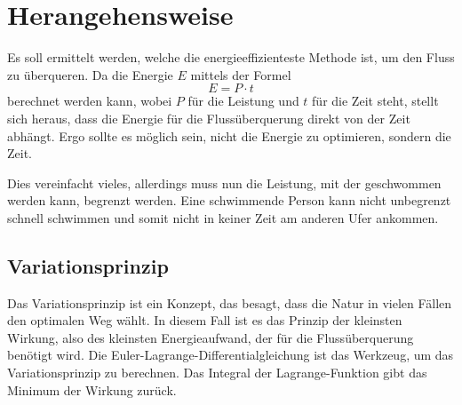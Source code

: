 %
%
%
%
\section{Herangehensweise\label{schwimmen:section:teil0}}

Es soll ermittelt werden, welche die energieeffizienteste Methode ist, um den Fluss zu überqueren. Da die Energie \(E\) mittels der Formel \[E = P \cdot t\] berechnet werden kann, wobei \(P\) für die Leistung und \(t\) für die Zeit steht, stellt sich heraus, dass die Energie für die Flussüberquerung direkt von der Zeit abhängt. Ergo sollte es möglich sein, nicht die Energie zu optimieren, sondern die Zeit.

Dies vereinfacht vieles, allerdings muss nun die Leistung, mit der geschwommen werden kann, begrenzt werden. Eine schwimmende Person kann nicht unbegrenzt schnell schwimmen und somit nicht in keiner Zeit am anderen Ufer ankommen.

\subsection{Variationsprinzip}
Das Variationsprinzip ist ein Konzept, das besagt, dass die Natur in vielen Fällen den optimalen Weg wählt. In diesem Fall ist es das Prinzip der kleinsten Wirkung, also des kleinsten Energieaufwand, der für die Flussüberquerung benötigt wird. Die Euler-Lagrange-Differentialgleichung ist das Werkzeug, um das Variationsprinzip zu berechnen. Das Integral der Lagrange-Funktion gibt das Minimum der Wirkung zurück.













